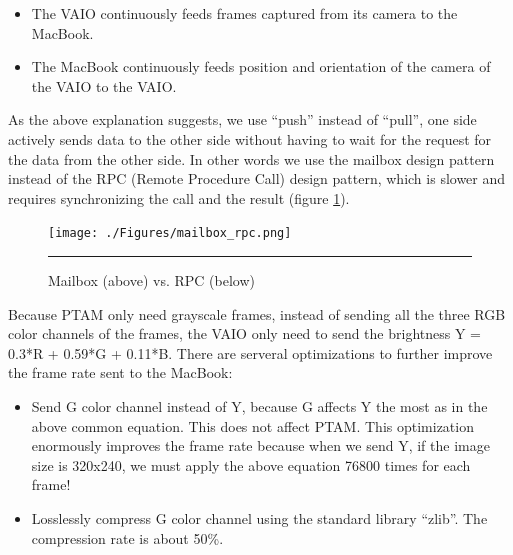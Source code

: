 \begin{itemize}
	\item The VAIO continuously feeds frames captured from its camera to the MacBook.
	\item The MacBook continuously feeds position and orientation of the camera of the VAIO to the VAIO.
\end{itemize}

As the above explanation suggests, we use ``push'' instead of ``pull'', one side actively sends data to the other side without having to wait for the request for the data from the other side. In other words we use the mailbox design pattern instead of the RPC (Remote Procedure Call) design pattern, which is slower and requires synchronizing the call and the result (figure \ref{fig:MailboxRPC}).

\begin{figure}[htbp]
	\centering
	\texttt{[image: ./Figures/mailbox\_rpc.png]}
	\rule{35em}{0.5pt}
	\caption[Mailbox vs. RPC]{Mailbox (above) vs. RPC (below)}
	\label{fig:MailboxRPC}
\end{figure}

Because PTAM only need grayscale frames, instead of sending all the three RGB color channels of the frames, the VAIO only need to send the brightness Y = 0.3*R + 0.59*G + 0.11*B. There are serveral optimizations to further improve the frame rate sent to the MacBook:

\begin{itemize}
	\item Send G color channel instead of Y, because G affects Y the most as in the above common equation. This does not affect PTAM. This optimization enormously improves the frame rate because when we send Y, if the image size is 320x240, we must apply the above equation 76800 times for each frame!
	\item Losslessly compress G color channel using the standard library ``zlib''. The compression rate is about 50\%.
\end{itemize}

